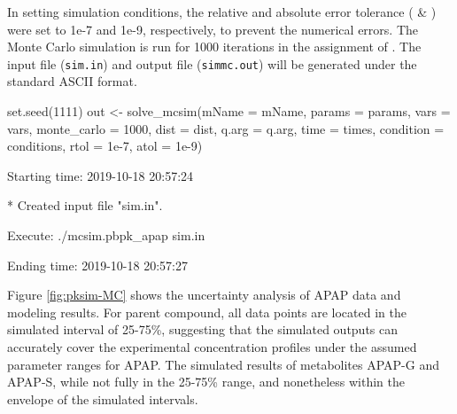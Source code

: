 In setting simulation conditions, the relative and absolute error
tolerance ( \& ) were set to 1e-7 and 1e-9,
respectively, to prevent the numerical errors. The Monte Carlo
simulation is run for 1000 iterations in the assignment of
. The input file (\texttt{sim.in}) and output file
(\texttt{simmc.out}) will be generated under the standard ASCII format.

\begin{Schunk}
\begin{Sinput}
set.seed(1111)
out <- solve_mcsim(mName = mName, params = params, vars = vars,
                   monte_carlo = 1000, dist = dist, q.arg = q.arg, 
                   time = times, condition = conditions, 
                   rtol = 1e-7, atol = 1e-9)
\end{Sinput}
\begin{Soutput}
  Starting time: 2019-10-18 20:57:24
\end{Soutput}
\begin{Soutput}
  * Created input file "sim.in".
\end{Soutput}
\begin{Soutput}
  Execute: ./mcsim.pbpk_apap sim.in
\end{Soutput}
\begin{Soutput}
  Ending time: 2019-10-18 20:57:27
\end{Soutput}
\end{Schunk}

Figure \ref{fig:pksim-MC} shows the uncertainty analysis of APAP data
and modeling results. For parent compound, all data points are located
in the simulated interval of 25-75\%, suggesting that the simulated
outputs can accurately cover the experimental concentration profiles
under the assumed parameter ranges for APAP. The simulated results of
metabolites APAP-G and APAP-S, while not fully in the 25-75\% range, and
nonetheless within the envelope of the simulated intervals.

